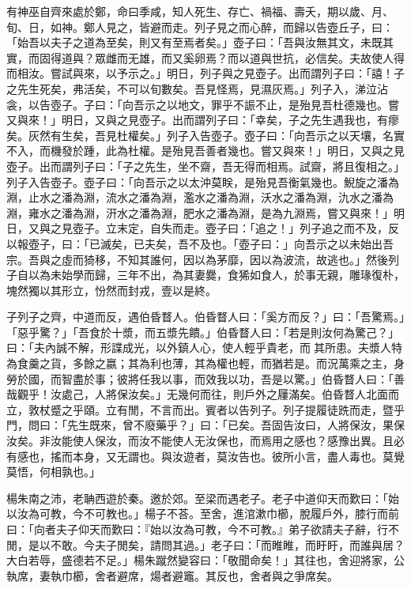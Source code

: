 \begin{pinyinscope}
有神巫自齊來處於鄭，命曰季咸，知人死生、存亡、禍福、壽夭，期以歲、月、旬、日，如神。鄭人見之，皆避而走。列子見之而心醉，而歸以告壺丘子，曰：「始吾以夫子之道為至矣，則又有至焉者矣。」壺子曰：「吾與汝無其文，未既其實，而固得道與？眾雌而无雄，而又奚卵焉？而以道與世抗，必信矣。夫故使人得而相汝。嘗試與來，以予示之。」明日，列子與之見壺子。出而謂列子曰：「譆！子之先生死矣，弗活矣，不可以旬數矣。吾見怪焉，見濕灰焉。」列子入，涕泣沾衾，以告壺子。子曰：「向吾示之以地文，罪乎不誫不止，是殆見吾杜德幾也。嘗又與來！」明日，又與之見壺子。出而謂列子曰：「幸矣，子之先生遇我也，有瘳矣。灰然有生矣，吾見杜權矣。」列子入告壺子。壺子曰：「向吾示之以天壤，名實不入，而機發於踵，此為杜權。是殆見吾善者幾也。嘗又與來！」明日，又與之見壺子。出而謂列子曰：「子之先生，坐不齋，吾无得而相焉。試齋，將且復相之。」列子入告壺子。壺子曰：「向吾示之以太沖莫眹，是殆見吾衡氣幾也。鯢旋之潘為淵，止水之潘為淵，流水之潘為淵，濫水之潘為淵，沃水之潘為淵，氿水之潘為淵，雍水之潘為淵，汧水之潘為淵，肥水之潘為淵，是為九淵焉，嘗又與來！」明日，又與之見壺子。立末定，自失而走。壺子曰：「追之！」列子追之而不及，反以報壺子，曰：「已滅矣，已夫矣，吾不及也。「壺子曰：」向吾示之以未始出吾宗。吾與之虛而猗移，不知其誰何，因以為茅靡，因以為波流，故逃也。」然後列子自以為未始學而歸，三年不出，為其妻爨，食狶如食人，於事无親，雕瑑復朴，塊然獨以其形立，㤋然而封戎，壹以是終。

子列子之齊，中道而反，遇伯昏瞀人。伯昏瞀人曰：「奚方而反？」曰：「吾驚焉。」「惡乎驚？」「吾食於十漿，而五漿先饋。」伯昏瞀人曰：「若是則汝何為驚己？」曰：「夫內誠不解，形諜成光，以外鎮人心，使人輕乎貴老，而𩐋其所患。夫漿人特為食羹之貨，多餘之嬴；其為利也薄，其為權也輕，而猶若是。而況萬乘之主，身勞於國，而智盡於事；彼將任我以事，而效我以功，吾是以驚。」伯昏瞀人曰：「善哉觀乎！汝處己，人將保汝矣。」无幾何而往，則戶外之屨滿矣。伯昏瞀人北面而立，敦杖蹙之乎頤。立有閒，不言而出。賓者以告列子。列子提履徒跣而走，暨乎門，問曰：「先生既來，曾不廢藥乎？」曰：「已矣。吾固告汝曰，人將保汝，果保汝矣。非汝能使人保汝，而汝不能使人无汝保也，而焉用之感也？感豫出異。且必有感也，搖而本身，又无謂也。與汝遊者，莫汝告也。彼所小言，盡人毒也。莫覺莫悟，何相孰也。」

楊朱南之沛，老聃西遊於秦。邀於郊。至梁而遇老子。老子中道仰天而歎曰：「始以汝為可教，今不可教也。」楊子不荅。至舍，進涫漱巾櫛，脫履戶外，膝行而前曰：「向者夫子仰天而歎曰：『始以汝為可教，今不可教。』弟子欲請夫子辭，行不閒，是以不敢。今夫子閒矣，請問其過。」老子曰：「而睢睢，而盱盱，而誰與居？大白若辱，盛德若不足。」楊朱蹴然變容曰：「敬聞命矣！」其往也，舍迎將家，公執席，妻執巾櫛，舍者避席，煬者避竈。其反也，舍者與之爭席矣。


\end{pinyinscope}
